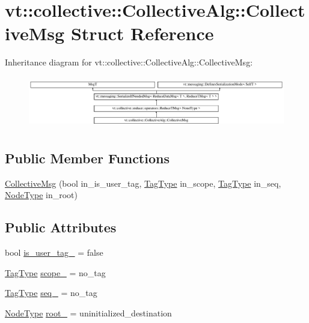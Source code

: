 \hypertarget{structvt_1_1collective_1_1_collective_alg_1_1_collective_msg}{}\section{vt\+:\+:collective\+:\+:Collective\+Alg\+:\+:Collective\+Msg Struct Reference}
\label{structvt_1_1collective_1_1_collective_alg_1_1_collective_msg}
Inheritance diagram for vt\+:\+:collective\+:\+:Collective\+Alg\+:\+:Collective\+Msg\+:\begin{figure}[H]
\begin{center}
\leavevmode
\includegraphics[height=2.299795cm]{structvt_1_1collective_1_1_collective_alg_1_1_collective_msg}
\end{center}
\end{figure}
\subsection*{Public Member Functions}
\begin{DoxyCompactItemize}
\item 
\hyperlink{structvt_1_1collective_1_1_collective_alg_1_1_collective_msg_aaada3dc8f56f22a51f0acafadc0f7da1}{Collective\+Msg} (bool in\+\_\+is\+\_\+user\+\_\+tag, \hyperlink{namespacevt_a84ab281dae04a52a4b243d6bf62d0e52}{Tag\+Type} in\+\_\+scope, \hyperlink{namespacevt_a84ab281dae04a52a4b243d6bf62d0e52}{Tag\+Type} in\+\_\+seq, \hyperlink{namespacevt_a866da9d0efc19c0a1ce79e9e492f47e2}{Node\+Type} in\+\_\+root)
\end{DoxyCompactItemize}
\subsection*{Public Attributes}
\begin{DoxyCompactItemize}
\item 
bool \hyperlink{structvt_1_1collective_1_1_collective_alg_1_1_collective_msg_abbea1ecbb8f581de22a00212c54c510b}{is\+\_\+user\+\_\+tag\+\_\+} = false
\item 
\hyperlink{namespacevt_a84ab281dae04a52a4b243d6bf62d0e52}{Tag\+Type} \hyperlink{structvt_1_1collective_1_1_collective_alg_1_1_collective_msg_a1199e6f4082c080b6e216b6799b8c901}{scope\+\_\+} = no\+\_\+tag
\item 
\hyperlink{namespacevt_a84ab281dae04a52a4b243d6bf62d0e52}{Tag\+Type} \hyperlink{structvt_1_1collective_1_1_collective_alg_1_1_collective_msg_ad0d769a13cfd2a0fe18b10b75a3d1d29}{seq\+\_\+} = no\+\_\+tag
\item 
\hyperlink{namespacevt_a866da9d0efc19c0a1ce79e9e492f47e2}{Node\+Type} \hyperlink{structvt_1_1collective_1_1_collective_alg_1_1_collective_msg_a03018b66962b29349783e4f93129df0f}{root\+\_\+} = uninitialized\+\_\+destination
\end{DoxyCompactItemize}

